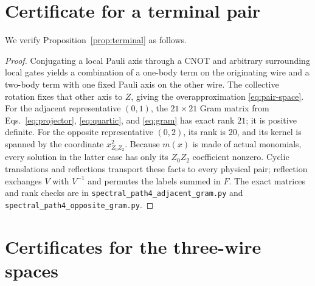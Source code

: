 \documentclass[11pt]{article}
\begin{document}
\section{Certificate for a terminal pair}\label{app:prop:terminal}

We verify Proposition~\ref{prop:terminal} as follows.
\begin{proof}
Conjugating a local Pauli axis through a CNOT and arbitrary surrounding
local gates yields a combination of a one-body term on the originating
wire and a two-body term with one fixed Pauli axis on the other wire.
The collective rotation fixes that other axis to $Z$, giving the
overapproximation \eqref{eq:pair-space}.  For the adjacent representative
$(0,1)$, the $21\times21$ Gram matrix from Eqs.~\eqref{eq:projector}, \eqref{eq:quartic}, and
\eqref{eq:gram} has exact rank $21$; it is positive definite.  For the
opposite representative $(0,2)$, its rank is $20$, and its kernel is
spanned by the coordinate $x_{Z_0Z_2}^{2}$.  Because $m(x)$ is made of
actual monomials, every solution in the latter case has only its
$Z_0Z_2$ coefficient nonzero.  Cyclic translations and reflections
transport these facts to every physical pair; reflection exchanges
$V$ with $V^{-1}$ and permutes the labels summed in $F$.
The exact matrices and rank checks are in
\texttt{spectral\_path4\_adjacent\_gram.py} and
\texttt{spectral\_path4\_opposite\_gram.py}.
\end{proof}
\section{Certificates for the three-wire spaces}\label{app:prop:chain}
\end{document}
